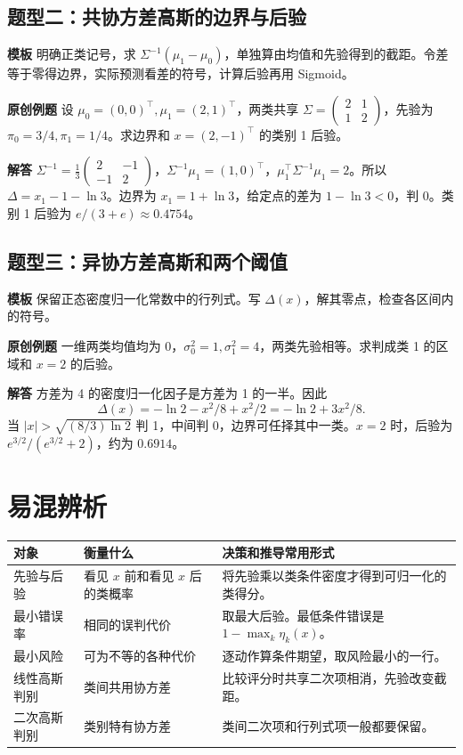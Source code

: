 \documentclass[UTF8,a4paper,zihao=-4,fontset=fandol]{ctexrep}
\begin{document}
\subsection*{题型二：共协方差高斯的边界与后验}
\textbf{模板} 明确正类记号，求 $\Sigma^{-1}(\mu_1-\mu_0)$，单独算由均值和先验得到的截距。令差等于零得边界，实际预测看差的符号，计算后验再用 Sigmoid。

\textbf{原创例题} 设 $\mu_0=(0,0)^\top,\mu_1=(2,1)^\top$，两类共享
$\Sigma=\left(\begin{smallmatrix}2&1\\1&2\end{smallmatrix}\right)$，先验为 $\pi_0=3/4,\pi_1=1/4$。求边界和 $x=(2,-1)^\top$ 的类别 1 后验。

\textbf{解答} $\Sigma^{-1}=\frac13\left(\begin{smallmatrix}2&-1\\-1&2\end{smallmatrix}\right)$，$\Sigma^{-1}\mu_1=(1,0)^\top$，$\mu_1^\top\Sigma^{-1}\mu_1=2$。所以 $\Delta=x_1-1-\ln 3$。边界为 $x_1=1+\ln 3$，给定点的差为 $1-\ln 3<0$，判 0。类别 1 后验为 $e/(3+e)\approx0.4754$。

\subsection*{题型三：异协方差高斯和两个阈值}
\textbf{模板} 保留正态密度归一化常数中的行列式。写 $\Delta(x)$，解其零点，检查各区间内的符号。

\textbf{原创例题} 一维两类均值均为 0，$\sigma_0^2=1,\sigma_1^2=4$，两类先验相等。求判成类 1 的区域和 $x=2$ 的后验。

\textbf{解答} 方差为 4 的密度归一化因子是方差为 1 的一半。因此
\[
 \Delta(x)=-\ln2-x^2/8+x^2/2=-\ln2+3x^2/8.
\]
当 $|x|>\sqrt{(8/3)\ln2}$ 判 1，中间判 0，边界可任择其中一类。$x=2$ 时，后验为 $e^{3/2}/(e^{3/2}+2)$，约为 $0.6914$。

\section{易混辨析}
\noindent\begin{tabularx}{\linewidth}{@{}l>{\raggedright\arraybackslash}X>{\raggedright\arraybackslash}X@{}}
\toprule
对象 & 衡量什么 & 决策和推导常用形式\\
\midrule
先验与后验 & 看见 $x$ 前和看见 $x$ 后的类概率 & 将先验乘以类条件密度才得到可归一化的类得分。\\
最小错误率 & 相同的误判代价 & 取最大后验。最低条件错误是 $1-\max_k\eta_k(x)$。\\
最小风险 & 可为不等的各种代价 & 逐动作算条件期望，取风险最小的一行。\\
线性高斯判别 & 类间共用协方差 & 比较评分时共享二次项相消，先验改变截距。\\
二次高斯判别 & 类别特有协方差 & 类间二次项和行列式项一般都要保留。\\
\bottomrule
\end{tabularx}
\end{document}
